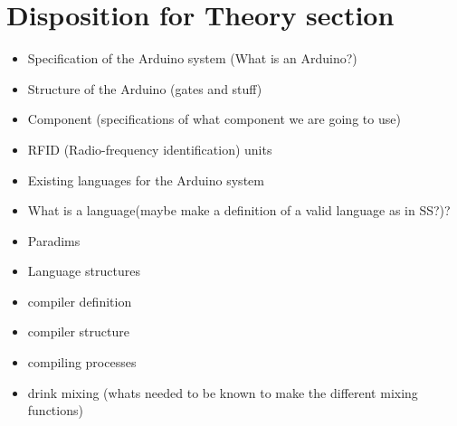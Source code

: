\section{Disposition for Theory section}
\begin{itemize}
\item Specification of the Arduino system (What is an Arduino?)
\item Structure of the Arduino (gates and stuff)
\item Component (specifications of what component we are going to use)
\item RFID (Radio-frequency identification) units
\item Existing languages for the Arduino system

\item What is a language(maybe make a definition of a valid language as in SS?)?
\item Paradims
\item Language structures

\item compiler definition
\item compiler structure
\item compiling processes

\item drink mixing (whats needed to be known to make the different mixing functions)
\end{itemize}